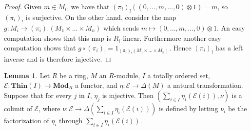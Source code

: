\documentclass[oneside,11pt]{amsart}
\newcommand{\bMod}{\ensuremath{\textbf{Mod}}}
\newcommand{\bThin}{\ensuremath{\textbf{Thin}}}
\newcommand{\mE}{\ensuremath{\mathcal{E}}}
\theoremstyle{definition}
\newtheorem{proof techniques}{Proof Techniques}
\newtheorem{lemma}{Lemma}
\begin{document}
\begin{proof}
Given $m \in M_i$, we have that $(\pi_i)_! ( (0 , \ldots, m , \ldots , 0) \otimes 1) = m$, so $(\pi_i)_!$ is surjective. On the other hand, consider the map $g : M_i \to (\pi_i)_! (M_1 \times \ldots \times M_n)$ which sends $m \mapsto (0 , \ldots, m , \ldots , 0) \otimes 1$. An easy computation shows that this map is $R_i$-linear.
Furthermore another easy computation shows that 
$g \circ (\pi_i)_! = 1_{(\pi_i)_!(M_1 \times \ldots \times M_n)}$. Hence $(\pi_i)_!$ has a left inverse and is therefore injective. 
\end{proof}


\begin{lemma}\label{lem: nested union as a colimit}
Let $R$ be a ring, $M$ an $R$-module, $I$ a totally ordered set, $\mE : \bThin(I) \to \bMod_R$ a functor, and $\eta  : \mE \to \Delta(M)$ a natural transformation. Suppose that for every $j$ in $I$, $\eta_j$ is injective. Then $(\sum_{i \in I}\eta_i(\mE(i)) , \nu)$ is a colimit of $\mE$, where $\nu: \mE \to \Delta( \sum_{i \in I}\eta_i(\mE(i)) )$ is defined by letting $\nu_i$ be the factorization of $\eta_i$ through $\sum_{i \in I}\eta_i(\mE(i))$. 
\end{lemma}
\end{document}
